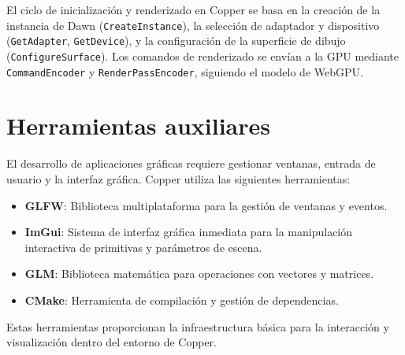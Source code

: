 El ciclo de inicialización y renderizado en Copper se basa en la creación de la
instancia de Dawn (\texttt{CreateInstance}), la selección de adaptador y
dispositivo (\texttt{GetAdapter}, \texttt{GetDevice}), y la configuración de la
superficie de dibujo (\texttt{ConfigureSurface}). Los comandos de renderizado
se envían a la GPU mediante \texttt{CommandEncoder} y
\texttt{RenderPassEncoder}, siguiendo el modelo de WebGPU.

\section{Herramientas auxiliares}

El desarrollo de aplicaciones gráficas requiere gestionar ventanas, entrada de
usuario y la interfaz gráfica. Copper utiliza las siguientes herramientas:

\begin{itemize}
    \item \textbf{GLFW}: Biblioteca multiplataforma para la gestión de ventanas y eventos\cite{glfw-docs}.
    \item \textbf{ImGui}: Sistema de interfaz gráfica inmediata para la manipulación interactiva de primitivas y parámetros de escena\cite{imgui}.
    \item \textbf{GLM}: Biblioteca matemática para operaciones con vectores y matrices\cite{glm}.
    \item \textbf{CMake}: Herramienta de compilación y gestión de dependencias\cite{cmake-docs}.
\end{itemize}

Estas herramientas proporcionan la infraestructura básica para la interacción y
visualización dentro del entorno de Copper.